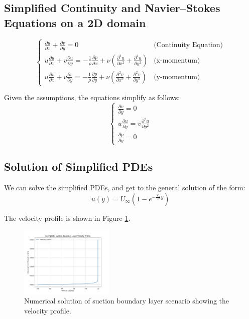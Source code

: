 \documentclass{article}
\begin{document}
\subsection{Simplified Continuity and Navier–Stokes Equations on a 2D domain}
\[
\begin{cases}
    \frac{\partial u}{\partial x} + \frac{\partial v}{\partial y} = 0 & \text{(Continuity Equation)} \\
    u \frac{\partial u}{\partial x} + v \frac{\partial u}{\partial y} = -\frac{1}{\rho} \frac{\partial p}{\partial x} + \nu \left(\frac{\partial^2 u}{\partial x^2} + \frac{\partial^2 u}{\partial y^2}\right) & \text{(x-momentum)} \\
    u \frac{\partial v}{\partial x} + v \frac{\partial v}{\partial y} = -\frac{1}{\rho} \frac{\partial p}{\partial y} + \nu \left(\frac{\partial^2 v}{\partial x^2} + \frac{\partial^2 v}{\partial y^2}\right) & \text{(y-momentum)}
\end{cases}
\]

Given the assumptions, the equations simplify as follows:
\[
\begin{cases}
    \frac{\partial v}{\partial y} = 0 \\
    u \frac{\partial u}{\partial y} = v \frac{\partial^2 u}{\partial y^2} \\
    \frac{\partial p}{\partial y} = 0
\end{cases}
\]

\subsection{Solution of Simplified PDEs}
We can solve the simplified PDEs, and get to the general solution of the form:
\[
u(y) = U_\infty \left(1 - e^{-\frac{V_w}{\nu} y}\right)
\]

The velocity profile is shown in Figure \ref{fig:suction boundary layer_solution}.
\begin{figure}[]
    \centering
    \includegraphics[width=0.4\textwidth]{output_plot.png}
    \caption{Numerical solution of suction boundary layer scenario showing the velocity profile.}
    \label{fig:suction boundary layer_solution}
\end{figure}
\end{document}
